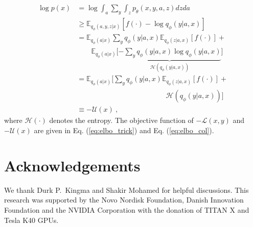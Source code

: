 \documentclass{article}
\begin{document}
\begin{align}
\log p(x) &= \log \int_a \sum_y \int_z p_\theta(x,y,a,z) dzda \nonumber\\
&\ge \mathbb{E}_{q_\phi(a,y,z|x)} \left [ f(\cdot) - \log q_\phi(y|a,x) \right] \\
&= \mathbb{E}_{q_\phi(a|x)}\sum_y q_\phi(y|a,x) \mathbb{E}_{q_\phi(z|a,x)} \left [ f(\cdot) \right] +  \nonumber \\
& \quad\quad \mathbb{E}_{q_\phi(a|x)} \big[\underbrace{-\sum_y q_\phi(y|a,x) \log q_\phi(y|a,x)}_{\mathcal{H}(q_\phi(y|a,x))}\big] \nonumber \\
&= \mathbb{E}_{q_\phi(a|x)} \bigg[\sum_y q_\phi(y|a,x) \mathbb{E}_{q_\phi(z|a,x)}\left[f(\cdot)\right] + \nonumber\\
&\quad\quad\quad\quad\quad\quad\quad\quad\quad\quad\quad\quad\ \  \mathcal{H}(q_\phi(y|a,x)) \bigg] \nonumber \\ 
&\equiv -\mathcal{U}(x)\ ,\nonumber
\end{align}
where $\mathcal{H}(\cdot)$ denotes the entropy. The objective function of $-\mathcal{L}(x,y)$ and $-\mathcal{U}(x)$ are given in Eq. (\ref{eq:elbo_trick}) and Eq. (\ref{eq:elbo_col}). 



\newpage
\section*{Acknowledgements} 
We thank Durk P.\ Kingma and Shakir Mohamed for helpful discussions. This research was supported by the Novo Nordisk Foundation, Danish Innovation Foundation and the NVIDIA Corporation with the donation of TITAN X and Tesla K40 GPUs.



\end{document}
